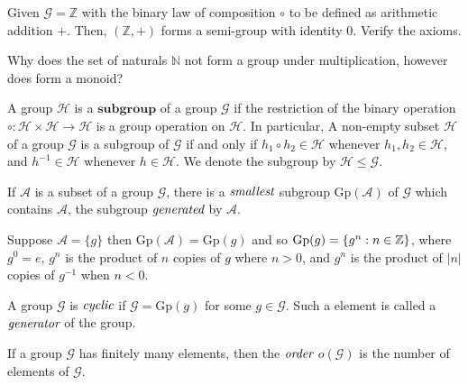 \begin{exmp}
 Given $\mathcal{G} = \mathbb{Z}$ with the binary law of composition $\circ$ to be defined as arithmetic addition $+$.
 Then, $(\mathbb{Z}, +)$ forms a semi-group with identity $0$. Verify the axioms.
\end{exmp}

\begin{question}
 Why does the set of naturals $\mathbb{N}$ not form a group under multiplication, however does form a monoid?
\end{question}

\begin{defn}[Subgroup]
	A group $\mathcal{H}$ is a $\textbf{subgroup}$ of a group $\mathcal{G}$ if the restriction of the binary operation
	$\circ : \mathcal{H} \times \mathcal{H} \to \mathcal{H}$ is a group operation on $\mathcal{H}$.
	In particular, A non-empty subset $\mathcal{H}$ of a group $\mathcal{G}$ is a subgroup of
	$\mathcal{G}$ if and only if $h_1 \circ h_2 \in \mathcal{H}$ whenever $h_1, h_2 \in \mathcal{H}$,
	and $h^{-1} \in \mathcal{H}$ whenever $h \in \mathcal{H}$. We denote the subgroup by $\mathcal{H} \leq \mathcal{G}$.
\end{defn}

\begin{thm}
	If $\mathcal{A}$ is a subset of a group $\mathcal{G}$, there is a $\emph{smallest}$ subgroup
	$\mbox{Gp}(\mathcal{A})$ of $\mathcal{G}$ which contains $\mathcal{A}$, the subgroup $\emph{generated}$
	by $\mathcal{A}$.
\end{thm}

\begin{exmp}
	Suppose $\mathcal{A}=\{g\}$ then $\mbox{Gp}(\mathcal{A})=\mbox{Gp}(g)$ and so
	$\mbox{Gp}(g) = \{ g^n : n \in \mathbb{Z} \}$, where $g^0 = e$, $g^n$ is the product of $n$ copies of $g$
	where $n>0$, and $g^n$ is the product of $|n|$ copies of $g^{-1}$ when $n<0$.
\end{exmp}

\begin{defn}
	A group $\mathcal{G}$ is $\emph{cyclic}$ if $\mathcal{G}=\mbox{Gp}(g)$ for some $g \in \mathcal{G}$.
	Such a element is called a $\emph{generator}$ of the group.
\end{defn}

\begin{defn}
	If a group $\mathcal{G}$ has finitely many elements, then the $\emph{order}$
	$o(\mathcal{G})$ is the number of elements of $\mathcal{G}$.
\end{defn}

